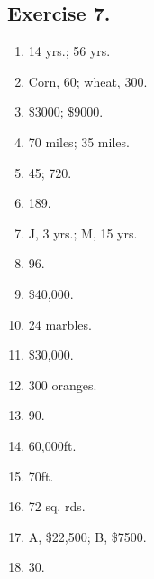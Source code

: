 \documentclass{book}
\begin{document}
\subsection*{Exercise 7.}
\begin{enumerate}
\item 14 yrs.; 56 yrs.

\item Corn, 60; wheat, 300.

\item \$3000; \$9000.

\item 70 miles; 35 miles.

\item 45; 720.

\item 189.

\item J, 3 yrs.; M, 15 yrs.

\item 96.

\item \$40,000.

\item 24 marbles.

\item \$30,000.

\item 300 oranges.

\item 90.

\item 60,000ft.

\item 70ft.

\item 72 sq. rds.

\item A, \$22,500; B, \$7500.

\item 30.
\end{enumerate}
\end{document}
